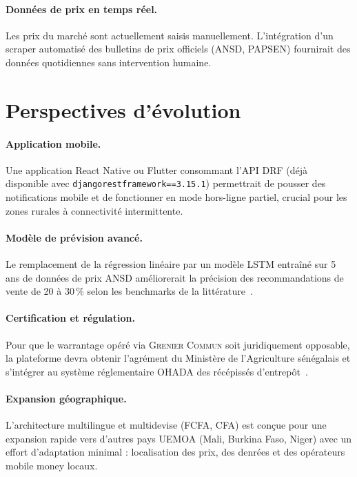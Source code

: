 \documentclass[12pt,a4paper,twoside]{report}
\newcommand{\gc}{\textsc{Grenier Commun}}
\begin{document}
\paragraph{Données de prix en temps réel.}
Les prix du marché sont actuellement saisis manuellement. L'intégration
d'un scraper automatisé des bulletins de prix officiels (ANSD, PAPSEN)
fournirait des données quotidiennes sans intervention humaine.

\section*{Perspectives d'évolution}

\paragraph{Application mobile.}
Une application React Native ou Flutter consommant l'API DRF (déjà disponible
avec \texttt{djangorestframework==3.15.1}) permettrait de pousser des
notifications mobile et de fonctionner en mode hors-ligne partiel,
crucial pour les zones rurales à connectivité intermittente.

\paragraph{Modèle de prévision avancé.}
Le remplacement de la régression linéaire par un modèle LSTM entraîné
sur 5 ans de données de prix ANSD améliorerait la précision des
recommandations de vente de 20 à 30\,\% selon les benchmarks de la
littérature~\cite{cao2019lstm,ghosh2019arima}.

\paragraph{Certification et régulation.}
Pour que le warrantage opéré via \gc{} soit juridiquement opposable,
la plateforme devra obtenir l'agrément du Ministère de l'Agriculture
sénégalais et s'intégrer au système réglementaire OHADA des récépissés
d'entrepôt~\cite{wfp2010warrantage}.

\paragraph{Expansion géographique.}
L'architecture multilingue et multidevise (FCFA, CFA) est conçue pour
une expansion rapide vers d'autres pays UEMOA (Mali, Burkina Faso, Niger)
avec un effort d'adaptation minimal : localisation des prix, des denrées
et des opérateurs mobile money locaux.
\end{document}
